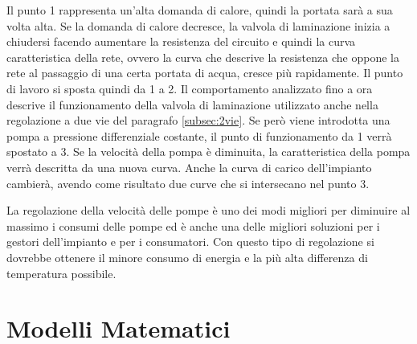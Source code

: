 \documentclass[laurea,oneside,11pt]{USiena_tesiLM}
\begin{document}
Il punto 1 rappresenta un'alta domanda di calore, quindi la portata sarà a sua volta alta. Se la domanda di calore decresce, la valvola di laminazione inizia a chiudersi facendo aumentare la resistenza del circuito e quindi la curva caratteristica della rete, ovvero la curva che descrive la resistenza che oppone la rete al passaggio di una certa portata di acqua, cresce più rapidamente. Il punto di lavoro si sposta quindi da 1 a 2. Il comportamento analizzato fino a ora descrive il funzionamento della valvola di laminazione utilizzato anche nella regolazione a due vie del paragrafo \ref{subsec:2vie}. Se però viene introdotta una pompa a pressione differenziale costante, il punto di funzionamento da 1 verrà spostato a 3. Se la velocità della pompa è diminuita, la caratteristica della pompa verrà descritta da una nuova curva. Anche la curva di carico dell'impianto cambierà, avendo come risultato due curve che si intersecano nel punto 3.      

La regolazione della velocità delle pompe è uno dei modi migliori per diminuire al massimo i consumi delle pompe ed è anche una delle migliori soluzioni per i gestori dell'impianto e per i consumatori. Con questo tipo di regolazione si dovrebbe ottenere il minore consumo di energia e la più alta differenza di temperatura possibile.

%
%
%


\chapter{Modelli Matematici}
\end{document}
